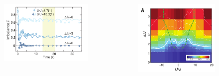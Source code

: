 \documentclass{beamer}
\begin{document}
\begin{frame}
\begin{columns}
\begin{figure}
\includegraphics[width=1\linewidth]{lm1.png}
\end{figure}
\begin{figure}
\includegraphics[width=1\linewidth]{lm2.png}
\end{figure}
\end{columns}
~\\
~\\
\end{frame}
\end{document}
